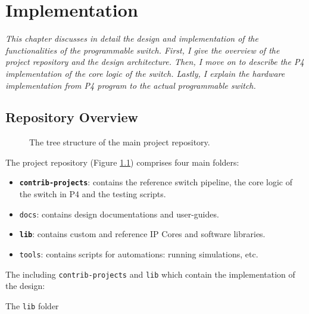 \chapter{Implementation}
\textit{This chapter discusses in detail the design and implementation of the functionalities of the programmable switch. First, I give the overview of the project repository and the design architecture. Then, I move on to describe the P4 implementation of the core logic of the switch. Lastly, I explain the hardware implementation from P4 program to the actual programmable switch.}

\section{Repository Overview}
\begin{figure}[!h]
	\caption{The tree structure of the main project repository.}
	\label{fig:project-overview}
\end{figure}

The project repository (Figure \ref{fig:project-overview}) comprises four main folders:
\begin{itemize}
	\item \textbf{\texttt{contrib-projects}}: contains the reference switch pipeline, the core logic of the switch in P4 and the testing scripts.
	\item \verb|docs|: contains design documentations and user-guides.
	\item \textbf{\texttt{lib}}: contains custom and reference IP Cores and software libraries.
	\item \verb|tools|: contains scripts for automations: running simulations, etc.
\end{itemize}

The including \verb|contrib-projects| and \verb|lib| which contain the implementation of the design:

The \verb|lib| folder 

